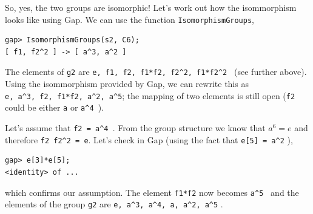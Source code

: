 So, yes, the two groups are isomorphic! Let's work out how the isommorphism looks like using Gap. We can use the function \verb+IsomorphismGroups+,

\begin{verbatim}
gap> IsomorphismGroups(s2, C6);
[ f1, f2^2 ] -> [ a^3, a^2 ]
\end{verbatim}


The elements of \verb+g2+ are \verb+e, f1, f2, f1*f2, f2^2, f1*f2^2 + (see further above). Using the isommorphism provided by Gap, we can rewrite this as \\
\verb+e, a^3, f2, f1*f2, a^2, a^5+; the mapping of two elements is still open (\verb+f2+ could be either \verb+a+ or \verb+a^4 +).

Let's assume that \verb+f2 = a^4 +. From the group structure we know that $a^6 = e$ and therefore \verb+f2 f2^2 = e+. Let's check in Gap (using the fact that \verb+e[5] = a^2+ ),

\begin{verbatim}
gap> e[3]*e[5];
<identity> of ...
\end{verbatim}

which confirms our assumption. The element \verb+f1*f2+ now becomes \verb+a^5 + and the elements of the group \verb+g2+ are \verb+e, a^3, a^4, a, a^2, a^5+ .


